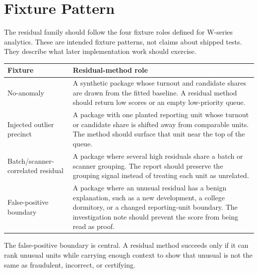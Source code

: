 \section{Fixture Pattern}

The residual family should follow the four fixture roles defined for W-series
analytics. These are intended fixture patterns, not claims about shipped tests.
They describe what later implementation work should exercise.

\begin{center}
\small
\begin{tabularx}{\textwidth}{lX}
\toprule
Fixture & Residual-method role \\
\midrule
No-anomaly & A synthetic package whose turnout and candidate shares are drawn from the fitted baseline. A residual method should return low scores or an empty low-priority queue. \\
Injected outlier precinct & A package with one planted reporting unit whose turnout or candidate share is shifted away from comparable units. The method should surface that unit near the top of the queue. \\
Batch/scanner-correlated residual & A package where several high residuals share a batch or scanner grouping. The report should preserve the grouping signal instead of treating each unit as unrelated. \\
False-positive boundary & A package where an unusual residual has a benign explanation, such as a new development, a college dormitory, or a changed reporting-unit boundary. The investigation note should prevent the score from being read as proof. \\
\bottomrule
\end{tabularx}
\end{center}

The false-positive boundary is central. A residual method succeeds only if it can
rank unusual units while carrying enough context to show that unusual is not the
same as fraudulent, incorrect, or certifying.

